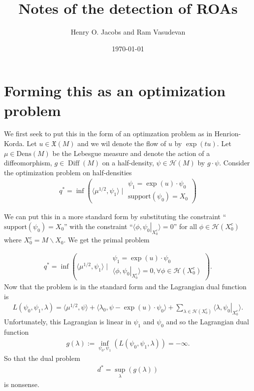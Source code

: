 \documentclass[12pt]{amsart}
\title{Notes of the detection of ROAs}
\author{Henry O. Jacobs and Ram Vasudevan}
\date{\today}
\DeclareMathOperator{\Diff}{Diff}
\begin{document}
\maketitle

\section{Forming this as an optimization problem}

We first seek to put this in the form of an optimzation problem as in Henrion-Korda.  Let $u \in \mathfrak{X}(M)$ and we wil denote the flow of $u$ by $\exp(t u)$.  Let $\mu \in \mathrm{Dens}(M)$ be the Lebesgue measure and denote the action of a diffeomorphism, $g \in \Diff(M)$ on a half-density, $\psi \in \mathcal{H}(M)$ by $g \cdot \psi$.  Consider the optimization problem on half-densities
\begin{align*}
  q^* = \inf  \left( \langle \mu^{1/2} , \psi_1 \rangle \mid 
    \begin{array}{l}
      \psi_1 = \exp (u) \cdot \psi_0 \\
      \mathrm{support}(\psi_0) = X_0
    \end{array}
  \right)
\end{align*}

We can put this in a more standard form by substituting the constraint 
``$\mathrm{support}(\psi_0) = X_0$'' with the constraint
``$\langle \phi , \left. \psi_0 \right|_{X_0^c} \rangle = 0$'' for all
$\phi \in \mathcal{H}( X_0^c )$ where $X_0^c = M \backslash X_0$.  We get the primal problem

\begin{align*}
  q^* = \inf  \left( \langle \mu^{1/2} , \psi_1 \rangle \mid 
    \begin{array}{l}
      \psi_1 = \exp (u) \cdot \psi_0 \\
      \langle \phi , \left. \psi_0 \right|_{X_0^c} \rangle = 0 , \forall \phi \in \mathcal{H}(X_0^c)
    \end{array}
  \right).
\end{align*}
Now that the problem is in the standard form and the Lagrangian dual function is
\begin{align*}
  L(\psi_0,\psi_1,\lambda) = \langle \mu^{1/2} , \psi \rangle + \langle \lambda_0 , \psi - \exp(u) \cdot \psi_0 \rangle + \sum_{ \lambda \in \mathcal{H}( X_0^c) } \langle \lambda , \left. \psi_0 \right|_{X_0^c} \rangle.
\end{align*}
Unfortunately, this Lagrangian is linear in $\psi_1$ and $\psi_0$ and so the Lagrangian dual function
\begin{align*}
  g(\lambda) := \inf_{\psi_0,\psi_1}( L(\psi_0,\psi_1,\lambda) ) = -\infty.
\end{align*}
So that the dual problem
\begin{align*}
  d^* = \sup_\lambda( g(\lambda) )
\end{align*}
is nonsense.
\end{document}
